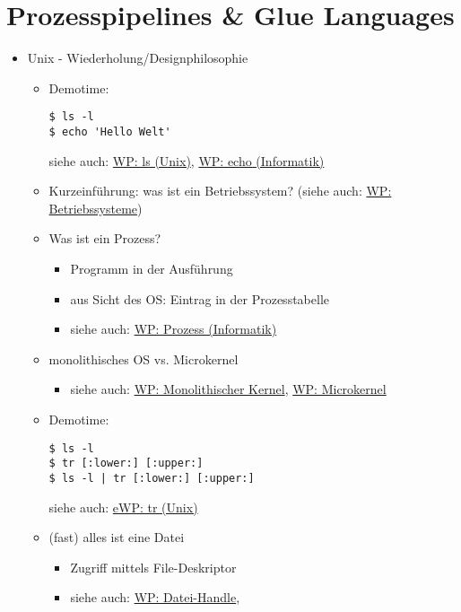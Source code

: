 \documentclass[%
a4paper, %
9pt,               %
leqno,              %
fleqn,              %
]
{scrartcl}
\begin{document}
\section*{Prozesspipelines \& Glue Languages}
\begin{itemize}
\item Unix - Wiederholung/Designphilosophie
  \begin{itemize}
  \item Demotime:
    \begin{lstlisting}
$ ls -l
$ echo 'Hello Welt'
    \end{lstlisting}
    siehe auch: \href{http://de.wikipedia.org/wiki/Ls_(Unix)}{WP: ls (Unix)},
    \href{http://de.wikipedia.org/wiki/Echo_(Informatik)}{WP: echo (Informatik)}
  \item Kurzeinführung: was ist ein Betriebssystem? (siehe auch:
    \href{https://de.wikipedia.org/wiki/Betriebssystem}{WP: Betriebssysteme})
  \item Was ist ein Prozess?
    \begin{itemize}
      \item Programm in der Ausführung
      \item aus Sicht des OS: Eintrag in der Prozesstabelle
      \item siehe auch:
        \href{http://de.wikipedia.org/wiki/Prozess_(Informatik)}{WP: Prozess
        (Informatik)}
    \end{itemize}
  \item monolithisches OS vs. Microkernel
    \begin{itemize}
      \item siehe auch:
        \href{https://de.wikipedia.org/wiki/Monolithischer_Kernel}{WP:
        Monolithischer Kernel},
        \href{https://de.wikipedia.org/wiki/Microkernel}{WP: Microkernel}
    \end{itemize}
  \item Demotime:
    \begin{lstlisting}
$ ls -l
$ tr [:lower:] [:upper:]
$ ls -l | tr [:lower:] [:upper:]
    \end{lstlisting}
    siehe auch: \href{http://en.wikipedia.org/wiki/Tr_(Unix)}{eWP: tr (Unix)}
  \item (fast) alles ist eine Datei
    \begin{itemize}
      \item Zugriff mittels File-Deskriptor
      \item siehe auch: \href{https://de.wikipedia.org/wiki/Datei-Handle}{WP:
        Datei-Handle}, 

\end{itemize}
\end{itemize}
\end{itemize}
\end{document}
